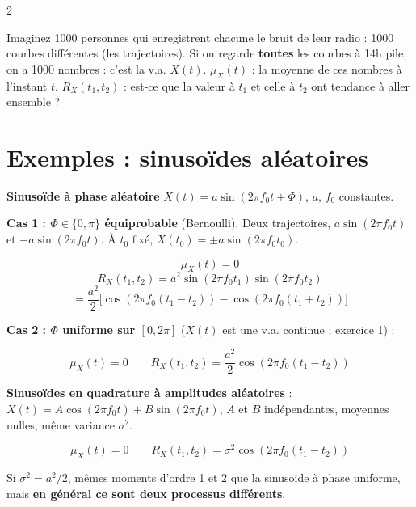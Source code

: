\documentclass[a4paper,9pt]{extarticle}
\begin{document}
\begin{multicols}{2}
\begin{simple}

Imaginez 1000 personnes qui enregistrent chacune le bruit de leur radio : 1000 courbes
différentes (les trajectoires). Si on regarde \textbf{toutes} les courbes à 14h pile, on a 1000
nombres : c'est la v.a. $X(t)$. $\mu_X(t)$ : la moyenne de ces nombres à l'instant $t$.
$R_X(t_1,t_2)$ : est-ce que la valeur à $t_1$ et celle à $t_2$ ont tendance à aller ensemble ?

\end{simple}


\section{Exemples : sinusoïdes aléatoires}


\begin{example}

\textbf{Sinusoïde à phase aléatoire} $X(t) = a\sin(2\pi f_0t + \Phi)$, $a$, $f_0$ constantes.

\vspace{3pt}

\textbf{Cas 1 : $\Phi \in \{0,\pi\}$ équiprobable} (Bernoulli). Deux trajectoires,
$a\sin(2\pi f_0t)$ et $-a\sin(2\pi f_0t)$. À $t_0$ fixé, $X(t_0) = \pm a\sin(2\pi f_0 t_0)$.

\[
\mu_X(t) = 0
\]
\[
R_X(t_1,t_2) = a^2\sin(2\pi f_0t_1)\sin(2\pi f_0t_2)
\]
\[
= \frac{a^2}2\big[\cos(2\pi f_0(t_1-t_2)) - \cos(2\pi f_0(t_1+t_2))\big]
\]

\textbf{Cas 2 : $\Phi$ uniforme sur $[0,2\pi]$} ($X(t)$ est une v.a. continue ; exercice 1) :

\[
\mu_X(t) = 0 \qquad R_X(t_1,t_2) = \frac{a^2}2\cos(2\pi f_0(t_1-t_2))
\]

\end{example}


\begin{example}

\textbf{Sinusoïdes en quadrature à amplitudes aléatoires} : $X(t) = A\cos(2\pi f_0 t) +
B\sin(2\pi f_0t)$, $A$ et $B$ indépendantes, moyennes nulles, même variance $\sigma^2$.

\[
\mu_X(t) = 0 \qquad R_X(t_1,t_2) = \sigma^2\cos(2\pi f_0(t_1-t_2))
\]

Si $\sigma^2 = a^2/2$, mêmes moments d'ordre 1 et 2 que la sinusoïde à phase uniforme, mais
\textbf{en général ce sont deux processus différents}.


\end{example}
\end{multicols}
\end{document}
